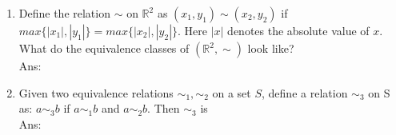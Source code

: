 \documentclass[10pt, letterpaper]{article}
\newcommand{\eat}[1]{}
\begin{document}
\begin{enumerate}


\item Define the relation $\sim$ on $\mathbb{R}^2$ as $(x_1, y_1) \sim (x_2, y_2)$ if $max\{|x_1|, |y_1|\} = max\{|x_2|,  |y_2|\}$. Here $|x|$ denotes the absolute value of $x$. What do the equivalence classes of $(\mathbb{R}^2, \sim)$ look like?\\
Ans:



\item Given two equivalence relations $\sim_1, \sim_2$ on a set $S$, define a relation $\sim_3$ on S as: $a \sim_3 b$ if $a \sim_1 b$ and $a \sim_2 b$. Then $\sim_3$ is\\
Ans:



\end{enumerate}
\end{document}
